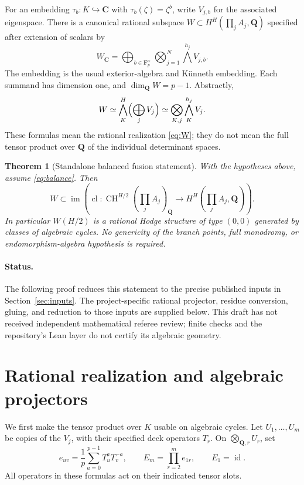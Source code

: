 \documentclass[11pt]{article}
\newtheorem{theorem}{Theorem}[section]
\theoremstyle{definition}
\newcommand{\Q}{\mathbf Q}
\newcommand{\C}{\mathbf C}
\newcommand{\F}{\mathbf F}
\newcommand{\CH}{\operatorname{CH}}
\newcommand{\cl}{\operatorname{cl}}
\newcommand{\id}{\operatorname{id}}
\newcommand{\im}{\operatorname{im}}
\begin{document}
For an embedding $\tau_b:K\hookrightarrow\C$ with $\tau_b(\zeta)=\zeta^b$,
write $V_{j,b}$ for the associated eigenspace. There is a canonical rational
subspace $W\subset H^H(\prod_j A_j,\Q)$ specified after extension of scalars by
\begin{equation}\label{eq:W}
 W_\C=\bigoplus_{b\in\F_p^\times}
       \bigotimes_{j=1}^N\bigwedge^{h_j}V_{j,b}.
\end{equation}
The embedding is the usual exterior-algebra and K\"unneth embedding. Each
summand has dimension one, and $\dim_\Q W=p-1$. Abstractly,
\[
 W\simeq\bigwedge_K^H\Bigl(\bigoplus_jV_j\Bigr)
       \simeq\bigotimes_{K,j}\bigwedge_K^{h_j}V_j.
\]
These formulas mean the rational realization \eqref{eq:W}; they do not mean the
full tensor product over $\Q$ of the individual determinant spaces.

\begin{theorem}[Standalone balanced fusion statement]\label{thm:fusion}
With the hypotheses above, assume \eqref{eq:balance}. Then
\[
 W\subset\im\left(\cl:\CH^{H/2}\left(\prod_j A_j\right)_\Q
                       \longrightarrow H^H\left(\prod_j A_j,\Q\right)\right).
\]
In particular $W(H/2)$ is a rational Hodge structure of type $(0,0)$ generated
by classes of algebraic cycles. No genericity of the branch points, full
monodromy, or endomorphism-algebra hypothesis is required.
\end{theorem}

\paragraph{Status.}
The following proof reduces this statement to the precise published inputs
in Section~\ref{sec:inputs}. The project-specific rational projector, residue
conversion, gluing, and reduction to those inputs are supplied below. This draft
has not received independent mathematical referee review; finite checks and the
repository's Lean layer do not certify its algebraic geometry.

\section{Rational realization and algebraic projectors}\label{sec:projectors}
We first make the tensor product over $K$ usable on algebraic cycles. Let
$U_1,\ldots,U_m$ be copies of the $V_j$, with their specified deck operators
$T_r$. On $\bigotimes_{\Q,r}U_r$, set
\begin{equation}\label{eq:projector}
 e_{uv}=\frac1p\sum_{a=0}^{p-1}T_u^aT_v^{-a},\qquad
 E_m=\prod_{r=2}^m e_{1r},\qquad E_1=\id.
\end{equation}
All operators in these formulas act on their indicated tensor slots.
\end{document}
